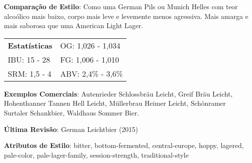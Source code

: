 \textbf{Comparação de Estilo}: Como uma German Pils ou Munich Helles com teor alcoólico mais baixo, corpo mais leve e levemente menos agressiva. Mais amarga e mais saborosa que uma American Light Lager.

\begin{tabular}{@{}p{35mm}p{35mm}@{}}
  \textbf{Estatísticas} & OG: 1,026 - 1,034 \\
  IBU: 15 - 28  & FG: 1,006 - 1,010  \\
  SRM: 1,5 - 4  & ABV: 2,4\% - 3,6\%
\end{tabular}

\textbf{Exemplos Comerciais}: Autenrieder Schlossbräu Leicht, Greif Bräu Leicht, Hohenthanner Tannen Hell Leicht, Müllerbrau Heimer Leicht, Schönramer Surtaler Schankbier, Waldhaus Sommer Bier.

\textbf{Última Revisão}: German Leichtbier (2015)

\textbf{Atributos de Estilo}: bitter, bottom-fermented, central-europe, hoppy, lagered, pale-color, pale-lager-family, session-strength, traditional-style
